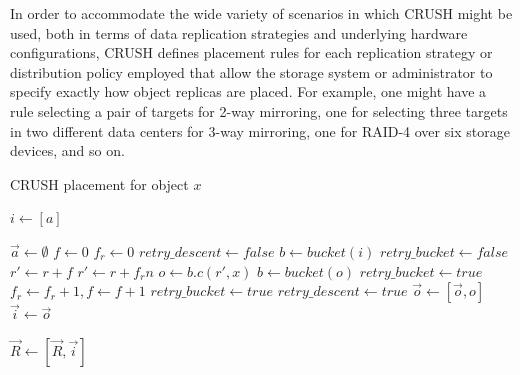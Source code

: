 \documentclass[12pt,a4paper]{report}
\begin{document}
In order to accommodate the wide variety of scenarios in which CRUSH might be
used, both in terms of data replication strategies and underlying hardware
configurations, CRUSH defines placement rules for each replication strategy or
distribution policy employed that allow the storage system or administrator to
specify exactly how object replicas are placed. For example, one might have a
rule selecting a pair of targets for 2-way mirroring, one for selecting three
targets in two different data centers for 3-way mirroring, one for RAID-4 over
six storage devices, and so on.

\begin{algorithm}
\caption{CRUSH placement for object $x$}
\label{algorithm:1}
\begin{algorithmic}[1]
	\State $i \gets [a]$
\EndProcedure

 
	\State $\vec{a} \gets \emptyset$
		\State $f \gets 0$ 
			\State $f_r \gets 0$ 
			\State $retry\_descent \gets false$
			\Repeat
				\State $ b \gets bucket(i) $
				\State $ retry\_bucket \gets false $
				\Repeat
						\State $r' \gets r + f$
					\Else
						\State $r' \gets r + f_rn$
					\EndIf
					\State $o \gets b.c(r',x)$ 
						\State $b \gets bucket(o)$
						\State $retry\_bucket \gets true$
						\State $f_r \gets f_r + 1, f \gets f + 1$
							\State $retry\_bucket \gets true$
						\Else
							\State $retry\_descent \gets true$
						\EndIf
					\EndIf
			\State $\vec{o} \gets [ \vec{o}, o ]$
		\EndFor
	\EndFor
	\State $\vec{i} \gets \vec{o}$
\EndProcedure

	\State $\vec{R} \gets [ \vec{R},\vec{i} ] $
\EndProcedure
\end{algorithmic}
\end{algorithm}
\end{document}

